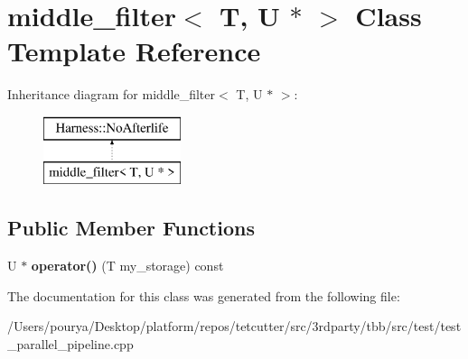 \hypertarget{classmiddle__filter_3_01T_00_01U_01_5_01_4}{}\section{middle\+\_\+filter$<$ T, U $\ast$ $>$ Class Template Reference}
\label{classmiddle__filter_3_01T_00_01U_01_5_01_4}
Inheritance diagram for middle\+\_\+filter$<$ T, U $\ast$ $>$\+:\begin{figure}[H]
\begin{center}
\leavevmode
\includegraphics[height=2.000000cm]{classmiddle__filter_3_01T_00_01U_01_5_01_4}
\end{center}
\end{figure}
\subsection*{Public Member Functions}
\begin{DoxyCompactItemize}
\item 
\hypertarget{classmiddle__filter_3_01T_00_01U_01_5_01_4_a49a1643e564b8bab0671f258db9b9901}{}U $\ast$ {\bfseries operator()} (T my\+\_\+storage) const \label{classmiddle__filter_3_01T_00_01U_01_5_01_4_a49a1643e564b8bab0671f258db9b9901}

\end{DoxyCompactItemize}


The documentation for this class was generated from the following file\+:\begin{DoxyCompactItemize}
\item 
/\+Users/pourya/\+Desktop/platform/repos/tetcutter/src/3rdparty/tbb/src/test/test\+\_\+parallel\+\_\+pipeline.\+cpp\end{DoxyCompactItemize}
